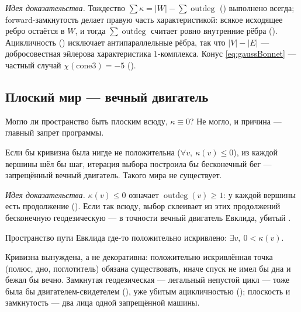 \emph{Идея доказательства.} Тождество $\sum\kappa = |W| - \sum\operatorname{outdeg}$
() выполнено всегда; forward-замкнутость делает правую часть характеристикой:
всякое исходящее ребро остаётся в $W$, и тогда $\sum\operatorname{outdeg}$ считает ровно внутренние
рёбра (). Ацикличность () исключает
антипараллельные рёбра, так что $|V| - |E|$ --- добросовестная эйлерова характеристика $1$-комплекса.
Конус \cref{eq:gaussBonnet} --- частный случай $\chi(\mathrm{cone3}) = -5$ ().

\subsection{Плоский мир --- вечный двигатель}

Могло ли пространство быть плоским всюду, $\kappa \equiv 0$? Не могло, и причина --- главный запрет
программы.

\begin{theorem}\label{thm:nonpositive_curvature_forces_engine}
\green{} Если бы кривизна была нигде не положительна ($\forall v,\ \kappa(v) \le 0$), из каждой
вершины шёл бы шаг, итерация выбора построила бы бесконечный бег --- запрещённый вечный двигатель.
Такого мира не существует.
\end{theorem}

\emph{Идея доказательства.} $\kappa(v) \le 0$ означает $\operatorname{outdeg}(v) \ge 1$: у каждой
вершины есть продолжение (). Если так всюду, выбор склеивает из
этих продолжений бесконечную геодезическую --- в точности вечный двигатель Евклида, убитый
.

\begin{theorem}\label{thm:space_positively_curved_somewhere}
\green{} Пространство пути Евклида где-то положительно искривлено: $\exists v,\ 0 < \kappa(v)$.
\end{theorem}

Кривизна вынуждена, а не декоративна: положительно искривлённая точка (полюс, дно, поглотитель) обязана
существовать, иначе спуск не имел бы дна и бежал бы вечно. Замкнутая геодезическая --- легальный
непустой цикл --- тоже была бы двигателем-свидетелем (), уже
убитым ацикличностью  (); плоскость и замкнутость --- два лица
одной запрещённой машины.

